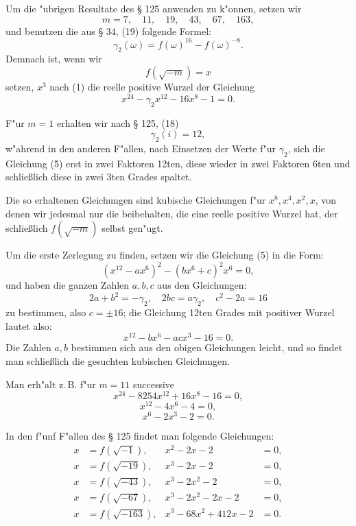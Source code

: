 \documentclass[12pt,a4paper]{article}
\theoremstyle{plain}
\theoremstyle{definition}
\theoremstyle{remark}
\begin{document}
Um die "ubrigen Resultate des \S{} 125 anwenden zu k"onnen, setzen wir
\[
m = 7, \quad 11, \quad 19, \quad 43, \quad 67, \quad 163,
\]
und benutzen die aus \S{} 34, (19) folgende Formel:
\[
\gamma_2(\omega) = f(\omega)^{16} - f(\omega)^{-8}.
\]
Demnach ist, wenn wir
\[
f(\sqrt{-m}) = x
\]
setzen, $x^3$ nach (1) die reelle positive Wurzel der Gleichung
\begin{equation}\label{eq:128_5}
x^{24} - \gamma_2 x^{12} - 16x^8 - 1 = 0.
\end{equation}

F"ur $m = 1$ erhalten wir nach \S{} 125, (18)
\begin{equation}\label{eq:128_6}
\gamma_2(i) = 12,
\end{equation}
w"ahrend in den anderen F"allen, nach Einsetzen der Werte f"ur $\gamma_2$, sich die Gleichung (5) erst in zwei Faktoren 12ten, diese wieder in zwei Faktoren 6ten und schlie\ss{}lich diese in zwei 3ten Grades spaltet.

Die so erhaltenen Gleichungen sind kubische Gleichungen f"ur $x^8, x^4, x^2, x$, von denen wir jedesmal nur die beibehalten, die eine reelle positive Wurzel hat, der schlie\ss{}lich $f(\sqrt{-m})$ selbst gen"ugt.

Um die erste Zerlegung zu finden, setzen wir die Gleichung (5) in die Form:
\[
(x^{12} - ax^6)^2 - (bx^6 + c)^2 x^6 = 0,
\]
und haben die ganzen Zahlen $a, b, c$ aus den Gleichungen:
\[
2a + b^2 = -\gamma_2, \quad 2bc = a\gamma_2, \quad c^2 - 2a = 16
\]
zu bestimmen, also $c = \pm 16$; die Gleichung 12ten Grades mit positiver Wurzel lautet also:
\[
x^{12} - bx^6 - acx^3 - 16 = 0.
\]
Die Zahlen $a, b$ bestimmen sich aus den obigen Gleichungen leicht, und so findet man schlie\ss{}lich die gesuchten kubischen Gleichungen.

Man erh"alt z.\,B. f"ur $m = 11$ successive
\[
x^{24} - 8254x^{12} + 16x^8 - 16 = 0,
\]
\[
x^{12} - 4x^6 - 4 = 0,
\]
\[
x^6 - 2x^3 - 2 = 0.
\]

In den f"unf F"allen des \S{} 125 findet man folgende Gleichungen:
\begin{align}
x &= f(\sqrt{-1}), & x^2 - 2x - 2 &= 0, \label{eq:128_7}\\
x &= f(\sqrt{-19}), & x^3 - 2x - 2 &= 0, \label{eq:128_8}\\
x &= f(\sqrt{-43}), & x^3 - 2x^2 - 2 &= 0, \label{eq:128_9}\\
x &= f(\sqrt{-67}), & x^3 - 2x^2 - 2x - 2 &= 0, \label{eq:128_10}\\
x &= f(\sqrt{-163}), & x^3 - 68x^2 + 412x - 2 &= 0. \label{eq:128_11}
\end{align}
\end{document}
